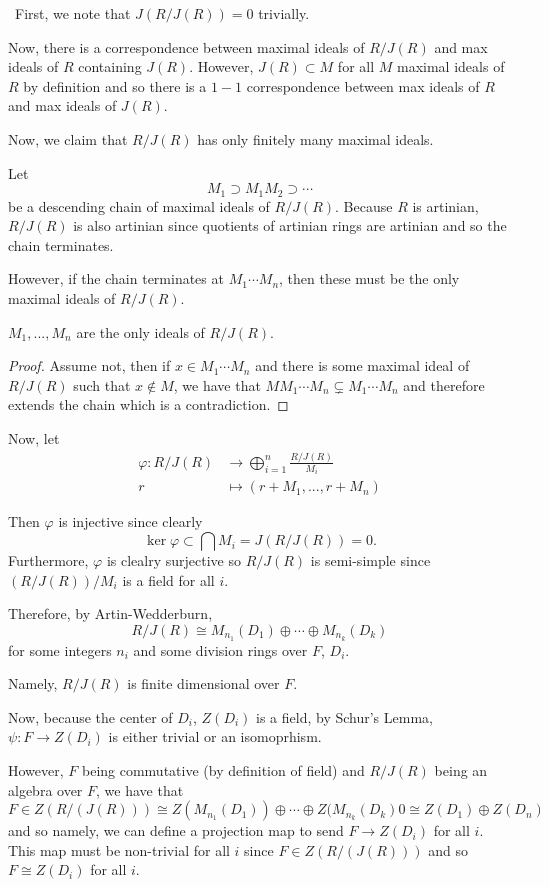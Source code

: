 \documentclass[12pt]{AlgebraQual}
\begin{document}
\begin{solution}$\,$
First, we note that $J(R/J(R))=0$ trivially.

Now, there is a correspondence between maximal ideals of $R/J(R)$ and max ideals of $R$ containing $J(R).$ However, $J(R)\subset M$ for all $M$ maximal ideals of $R$ by definition and so there is a $1-1$ correspondence between max ideals of $R$ and max ideals of $J(R).$

Now, we claim that $R/J(R)$ has only finitely many maximal ideals.

Let $$M_1\supset M_1M_2\supset\cdots $$ be a descending chain of maximal ideals of $R/J(R)$. Because $R$ is artinian, $R/J(R)$ is also artinian since quotients of artinian rings are artinian and so the chain terminates.

However, if the chain terminates at $M_1\cdots M_n$, then these must be the only maximal ideals of $R/J(R).$

\begin{claim} $M_1,...,M_n$ are the only ideals of $R/J(R).$
\begin{proof}
Assume not, then if $x\in M_1\cdots M_n$ and there is some maximal ideal of $R/J(R)$ such that $x\notin M$, we have that $MM_1\cdots M_n\subsetneq M_1\cdots M_n$ and therefore extends the chain which is a contradiction.
\end{proof}
\end{claim}

Now, let \begin{align*}
    \varphi: R/J(R)&\to\bigoplus_{i=1}^n\frac{R/J(R)}{M_i}\\
    r&\mapsto(r+M_1,...,r+M_n)
\end{align*}

Then $\varphi$ is injective since clearly $$\ker\varphi\subset \bigcap M_i=J(R/J(R))=0.$$ Furthermore, $\varphi$ is clealry surjective so $R/J(R)$ is semi-simple since $(R/J(R))/M_i$ is a field for all $i.$

Therefore, by Artin-Wedderburn, $$R/J(R)\cong M_{n_1}(D_1)\oplus\cdots\oplus M_{n_k}(D_k)$$ for some integers $n_i$ and some division rings over $F$, $D_i$.

Namely, $R/J(R)$ is finite dimensional over $F$.

Now, because the center of $D_i$, $Z(D_i)$ is a field, by Schur's Lemma, $\psi:F\to Z(D_i)$ is either trivial or an isomoprhism.

However, $F$ being commutative (by definition of field) and $R/J(R)$ being an algebra over $F$, we have that $$F\in Z(R/(J(R)))\cong  Z(M_{n_1}(D_1))\oplus\cdots\oplus Z(M_{n_k}(D_k)0\cong Z(D_1)\oplus Z(D_n)$$ and so namely, we can define a projection map to send $F\to Z(D_i)$ for all $i.$ This map must be non-trivial for all $i$ since $F\in Z(R/(J(R)))$ and so $F\cong Z(D_i)$ for all $i.$


\end{solution}
\end{document}
